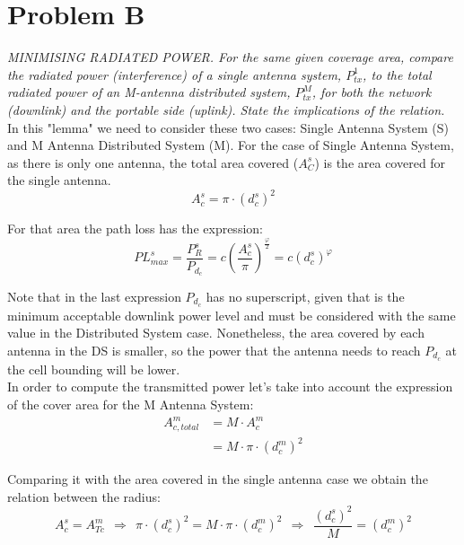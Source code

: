 \section{Problem B}
\textit{MINIMISING RADIATED POWER. For the same given coverage area, compare the radiated power (interference) of a single antenna system, $P_{tx}^1$, to the total radiated power of an M-antenna distributed system, $P_{tx}^M$, for both the network (downlink) and the portable side (uplink). State the implications of the relation.}\\

In this "lemma" we need to consider these two cases: Single Antenna System (S) and M Antenna Distributed System (M).
For the case of Single Antenna System, as there is only one antenna, the total area covered ($A^s_C$) is the area covered for the single antenna.
\begin{equation}
A^s_c = \pi \cdot (d^s_{c})^2
\end{equation}

For that area the path loss has the expression:
\begin{equation}
PL^s_{max} = \dfrac{P^s_{R}}{P_{d_{c}}} = c\left(\dfrac{A^s_c}{\pi}\right)^{\frac{\varphi}{2}}= c\left(d^s_c\right) ^{\varphi}
\end{equation}

Note that in the last expression $P_{d_{c}}$ has no superscript, given that is the minimum acceptable downlink power level and must be considered with the same value in the Distributed System case. Nonetheless, the area covered by each antenna in the DS is smaller, so the power that the antenna needs to reach $P_{d_{c}}$ at the cell bounding will be lower.\\

In order to compute the transmitted power let's take into account the expression of the cover area for the M Antenna System:
\begin{align*}
A^m_{c,total} &= M \cdot A^m_{c} \\
&= M \cdot \pi \cdot (d^m_{c})^{2}
\end{align*}

Comparing it with the area covered in the single antenna case we obtain the relation between the radius:
\begin{equation}
A^s_{c}= A^m_{Tc}\ \ \Longrightarrow \ \ \pi \cdot (d^s_{c})^2 = M \cdot \pi \cdot (d^m_{c})^2 \ \  \Longrightarrow \ \
\frac{(d^s_{c})^2}{M} = (d^m_{c})^2
\end{equation}

